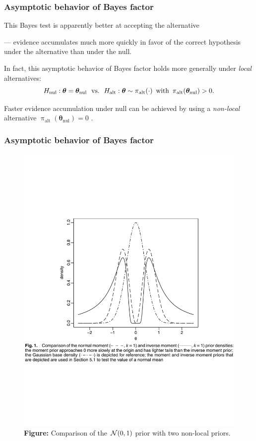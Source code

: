 \documentclass[18pt]{beamer}
\newcommand{\defineTightSpacing}{%
	\setlength{\abovedisplayskip}{.25\baselineskip}%
	\setlength{\belowdisplayskip}{.25\baselineskip}%
}
\newcommand{\thinnerspace}{\mskip.5\thinmuskip}
\newcommand{\normalDist}{\operatorname{\mathcal{N}}}
\newcommand{\density}{\operatorname{\pi}}
\newcommand{\btheta}{\bm{\theta}}
\newcommand{\hypothesis}{H}
\newcommand{\nullSub}{\mathrm{nul}}
\newcommand{\altSub}{\mathrm{alt}}
\begin{document}
\begin{frame}
\frametitle{Asymptotic behavior of Bayes factor}
This Bayes test is apparently better at accepting the alternative

\pause
--- evidence accumulates much more quickly in favor of the correct hypothesis under the alternative than under the null.

\pause
\smallskip
In fact, this asymptotic behavior of Bayes factor holds more generally under \textit{local} alternatives:
\begin{equation*} \defineTightSpacing%
\hypothesis_\nullSub: \btheta = \btheta_\nullSub
	\ \text{ vs.\ } \ 
\hypothesis_\altSub: \btheta \sim \density_\altSub(\cdot)
	\, \text{ with } \density_\altSub(\btheta_\nullSub) > 0.
\end{equation*}

\pause
Faster evidence accumulation under null can be achieved by using a \textit{non-local} alternative $\density_\altSub(\btheta_\nullSub) = 0$ \citep{johnson2010nonlocal}.
\end{frame}


\begin{frame}
\frametitle{Asymptotic behavior of Bayes factor}
\begin{figure}
\centering
\includegraphics[width=.9\linewidth]{Figure/non_local_prior}
\caption*{\textcolor{themecolor}{\textbf{Figure:}}
	Comparison of the $\thinnerspace \normalDist(0, 1)$ prior with two  non-local priors.
}
\end{figure}
\end{frame}
\end{document}
